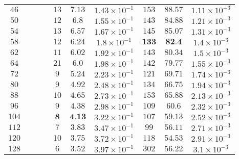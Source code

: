 \begin{center}
\begin{table}
\begin{center}
\begin{tabular}{ c||ccc|ccc|ccc }
$46$  &&&& $13$ & $7.13$ & $1.43\times 10^{-1}$ & $153$ & $88.57$ & $1.11\times 10^{-3}$  \\ 
$50$  &&&& $12$ & $6.8$ & $1.55\times 10^{-1}$  & $143$ & $84.88$ & $1.21\times 10^{-3}$  \\ 
$54$  &&&& $13$ & $6.57$ & $1.67\times 10^{-1}$ & $145$ & $85.07$ & $1.31\times 10^{-3}$  \\ 
$58$  &&&& $12$ & $6.24$ & $1.8\times 10^{-1}$  & $\textbf{133}$ & $\textbf{82.4}$ & $1.4\times 10^{-3}$    \\ 
$62$  &&&& $11$ & $6.02$ & $1.92\times 10^{-1}$ & $143$ & $80.34$ & $1.5\times 10^{-3}$   \\ 
$64$  &&&& $21$ & $6.0$ & $1.98\times 10^{-1}$  & $142$ & $79.77$ & $1.55\times 10^{-3}$  \\ 
$72$  &&&& $9$ & $5.24$ & $2.23\times 10^{-1}$  & $121$ & $69.71$ & $1.74\times 10^{-3}$  \\ 
$80$  &&&& $9$ & $4.92$ & $2.48\times 10^{-1}$  & $134$ & $66.75$ & $1.94\times 10^{-3}$  \\ 
$88$  &&&& $10$ & $4.65$ & $2.73\times 10^{-1}$ & $153$ & $65.88$ & $2.13\times 10^{-3}$  \\ 
$96$  &&&& $9$ & $4.38$ & $2.98\times 10^{-1}$  & $109$ & $60.6$ & $2.32\times 10^{-3}$   \\ 
$104$ &&&& $\textbf{8}$ & $\textbf{4.13}$ & $3.22\times 10^{-1}$  & $107$ & $59.13$ & $2.52\times 10^{-3}$  \\ 
$112$ &&&& $7$ & $3.83$ & $3.47\times 10^{-1}$  & $99$ & $56.11$ & $2.71\times 10^{-3}$   \\ 
$120$ &&&& $10$ & $3.75$ & $3.72\times 10^{-1}$ & $118$ & $54.53$ & $2.91\times 10^{-3}$  \\ 
$128$ &&&& $6$ & $3.52$ & $3.97\times 10^{-1}$  & $302$ & $56.22$ & $3.1\times 10^{-3}$   \\ 
		 
		
		\hline  
		
		\end{tabular}
	\end{center}
	\end{table}	
	\end{center}